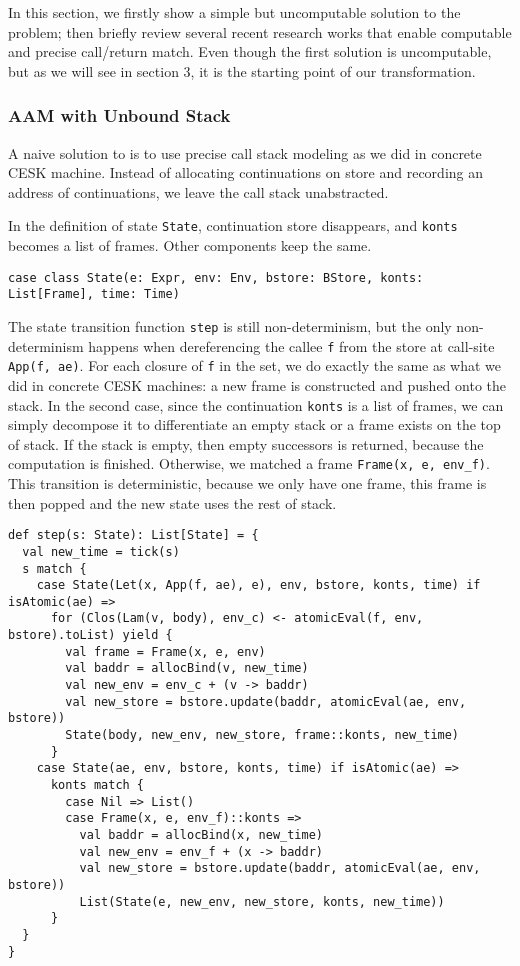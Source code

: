 \documentclass[acmsmall,review,anonymous]{acmart}\settopmatter{printfolios=true,printccs=false,printacmref=false}
\begin{document}
In this section, we firstly show a simple but uncomputable solution to the
problem; then briefly review several recent research works that enable
computable and precise call/return match. Even though the first solution is
uncomputable, but as we will see in section 3, it is the starting point of our
transformation. 

\subsubsection{AAM with Unbound Stack}

A naive solution to is to use precise call stack modeling as we did in concrete
CESK machine. Instead of allocating continuations on store and recording an 
address of continuations, we leave the call stack unabstracted. 

In the definition of state \texttt{State}, continuation store disappears, and
\texttt{konts} becomes a list of frames. Other components keep the same.

\begin{verbatim}
case class State(e: Expr, env: Env, bstore: BStore, konts: List[Frame], time: Time)
\end{verbatim}

The state transition function \texttt{step} is still non-determinism, but
the only non-determinism happens when dereferencing the callee \texttt{f} 
from the store at call-site \texttt{App(f, ae)}. 
For each closure of \texttt{f} in the set, we do exactly
the same as what we did in concrete CESK machines: a new frame is constructed
and pushed onto the stack.
In the second case, since the continuation \texttt{konts} is a list of 
frames, we can simply decompose it to differentiate an empty stack
or a frame exists on the top of stack. 
If the stack is empty, then empty successors is returned, because the computation
is finished.
Otherwise, we matched a frame \texttt{Frame(x, e, env_f)}. 
This transition is deterministic, because we only have one frame, this frame
is then popped and the new state uses the rest of stack.

\begin{verbatim}
def step(s: State): List[State] = {
  val new_time = tick(s)
  s match {
    case State(Let(x, App(f, ae), e), env, bstore, konts, time) if isAtomic(ae) =>
      for (Clos(Lam(v, body), env_c) <- atomicEval(f, env, bstore).toList) yield {
        val frame = Frame(x, e, env)
        val baddr = allocBind(v, new_time)
        val new_env = env_c + (v -> baddr)
        val new_store = bstore.update(baddr, atomicEval(ae, env, bstore))
        State(body, new_env, new_store, frame::konts, new_time)
      }
    case State(ae, env, bstore, konts, time) if isAtomic(ae) =>
      konts match {
        case Nil => List()
        case Frame(x, e, env_f)::konts =>
          val baddr = allocBind(x, new_time)
          val new_env = env_f + (x -> baddr)
          val new_store = bstore.update(baddr, atomicEval(ae, env, bstore))
          List(State(e, new_env, new_store, konts, new_time))
      }
  }
}
\end{verbatim}
\end{document}
